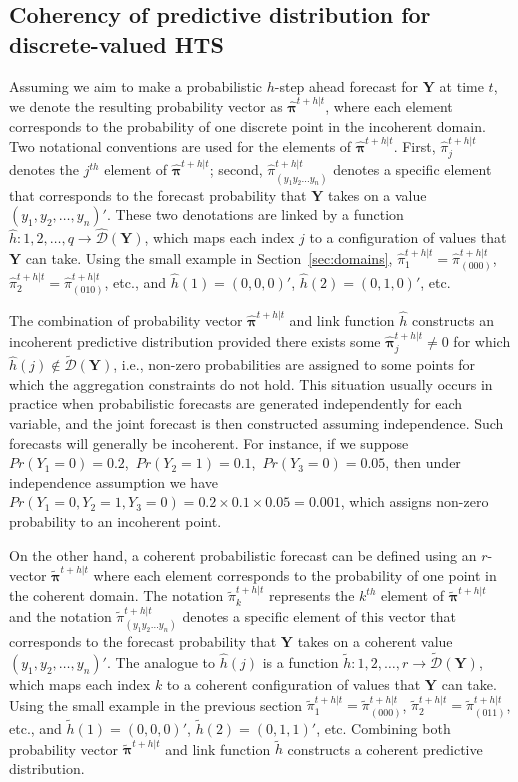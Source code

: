 \documentclass[a4paper,review,12pt,authoryear]{elsarticle}
\newcommand{\bY}{\mathbf{Y}}
\newcommand{\bpi}{\bm{\pi}}
\begin{document}
  \subsection{Coherency of predictive distribution for discrete-valued HTS}
  
  \label{sec:coherent_df}

  Assuming we aim to make a probabilistic $h$-step ahead forecast for $\bY$ at time $t$, we denote the resulting probability vector as $\hat{\bpi}^{t+h|t}$, where each element corresponds to the probability of one discrete point in the incoherent domain. 
  Two notational conventions are used for the elements of $\hat{\bpi}^{t+h|t}$.
  First, $\hat{\pi}_j^{t+h|t}$ denotes the $j^{th}$ element of $\hat{\bpi}^{t+h|t}$;  
  second, $\hat{\pi}_{(y_1 y_2 \dots y_n)}^{t+h|t}$ denotes a specific element that corresponds to the forecast probability that $\bY$ takes on a value $(y_1,y_2,\dots,y_n)'$. These two denotations are linked by a function $\hat{h}:{1,2,\dots,q}\rightarrow\hat{\mathcal{D}}(\bY)$, which maps each index $j$ to a configuration of values that $\bY$ can take. 
  Using the small example in Section~\ref{sec:domains}, $\hat{\pi}_1^{t+h|t}=\hat{\pi}_{(000)}^{t+h|t}$, $\hat{\pi}_2^{t+h|t}=\hat{\pi}_{(010)}^{t+h|t}$, etc., and $\hat{h}(1)=(0,0,0)'$, $\hat{h}(2)=(0,1,0)'$, etc.
  
  The combination of probability vector $\hat{\bpi}^{t+h|t}$ and link function $\hat h$ constructs an incoherent predictive distribution provided there exists some $\hat{\bpi}^{t+h|t}_j\neq 0$ for which $\hat{h}(j)\notin\tilde{\mathcal{D}}(\bY)$, i.e., non-zero probabilities are assigned to some points for which the aggregation constraints do not hold. 
  This situation usually occurs in practice when probabilistic forecasts are generated independently for each variable, and the joint forecast is then constructed assuming independence. 
  Such forecasts will generally be incoherent. 
  For instance, if we suppose $Pr(Y_1=0)=0.2$,~$Pr(Y_2=1)=0.1$,~$Pr(Y_3=0)=0.05$, then under independence assumption we have $Pr(Y_1=0,Y_2=1,Y_3=0)=0.2\times0.1\times0.05=0.001$, which assigns non-zero probability to an incoherent point.
  
  On the other hand, a coherent probabilistic forecast can be defined using an $r$-vector $\tilde{\bpi}^{t+h|t}$ where each element corresponds to the probability of one point in the coherent domain. 
  The notation $\tilde{\pi}_k^{t+h|t}$ represents the $k^{th}$ element of $\tilde{\bpi}^{t+h|t}$ and the notation $\tilde{\pi}_{(y_1 y_2 \dots y_n)}^{t+h|t}$ denotes a specific element of this vector that corresponds to the forecast probability that $\bY$ takes on a coherent value $(y_1,y_2,\dots,y_n)'$. 
  The analogue to $\hat{h}(j)$ is a function  $\tilde{h}:{1,2,\dots,r}\rightarrow\tilde{\mathcal{D}}(\bY)$, which maps each index $k$ to a coherent configuration of values that $\bY$ can take. 
  Using the small example in the previous section $\tilde{\pi}_1^{t+h|t}=\tilde{\pi}_{(000)}^{t+h|t}$, $\tilde{\pi}_2^{t+h|t}=\tilde{\pi}_{(011)}^{t+h|t}$, etc., and $\tilde{h}(1)=(0,0,0)'$, $\tilde{h}(2)=(0,1,1)'$, etc.
  Combining both probability vector $\tilde{\bpi}^{t+h|t}$ and link function $\tilde{h}$ constructs a coherent predictive distribution.
  
\end{document}
